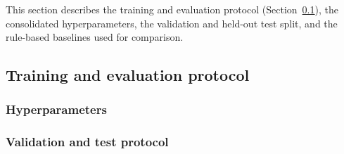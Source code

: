 \documentclass[preprint,12pt, 3p]{elsarticle}
\begin{document}
This section describes the training and evaluation protocol (Section~\ref{subsec:protocol}), the consolidated hyperparameters, the validation and held-out test split, and the rule-based baselines used for comparison.

\subsection{Training and evaluation protocol}
\label{subsec:protocol}


\subsubsection{Hyperparameters}
\label{subsubsec:protocol_hp}


\subsubsection{Validation and test protocol}
\label{subsubsec:protocol_eval}
\end{document}
